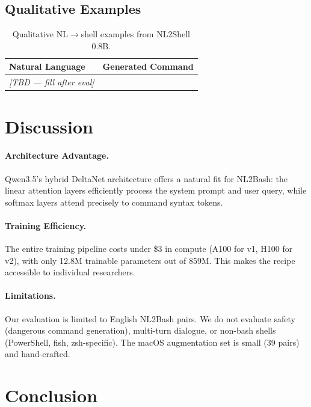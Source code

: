 \documentclass[11pt,a4paper]{article}
\begin{document}
\subsection{Qualitative Examples}

\begin{table}[t]
\centering
\small
\begin{tabular}{p{4.5cm}p{4.5cm}}
\toprule
\textbf{Natural Language} & \textbf{Generated Command} \\
\midrule
\textit{[TBD --- fill after eval]} & \\
\bottomrule
\end{tabular}
\caption{Qualitative NL$\rightarrow$shell examples from NL2Shell 0.8B.}
\label{tab:qualitative}
\end{table}

\section{Discussion}

\paragraph{Architecture Advantage.}
Qwen3.5's hybrid DeltaNet architecture offers a natural fit for NL2Bash: the linear attention layers efficiently process the system prompt and user query, while softmax layers attend precisely to command syntax tokens.

\paragraph{Training Efficiency.}
The entire training pipeline costs under \$3 in compute (A100 for v1, H100 for v2), with only 12.8M trainable parameters out of 859M.
This makes the recipe accessible to individual researchers.

\paragraph{Limitations.}
Our evaluation is limited to English NL2Bash pairs.
We do not evaluate safety (dangerous command generation), multi-turn dialogue, or non-bash shells (PowerShell, fish, zsh-specific).
The macOS augmentation set is small (39 pairs) and hand-crafted.

\section{Conclusion}
\end{document}
